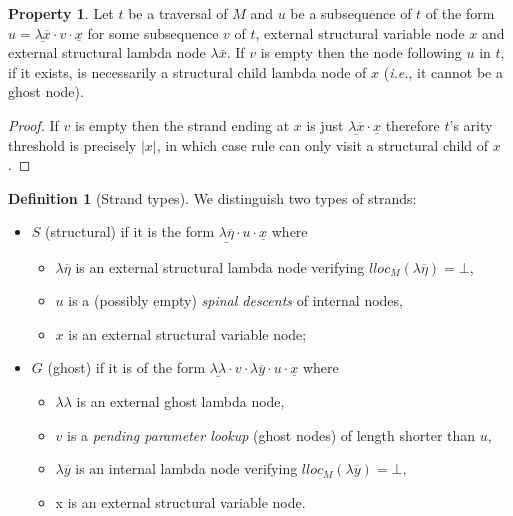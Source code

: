 \documentclass{elsarticle}
\makeatletter
\theoremstyle{plain}
\theoremstyle{definition}
\newtheorem{definition}{Definition}[section]
\newtheorem{property}{Property}[section]
\theoremstyle{remark}
\newcommand{\ghostlmd}{{\lambda\!\!\lambda}}
\renewcommand\ie{{\it i.e.\@\xspace}}
\makeatother
\begin{document}
\begin{property}
\label{prop:strand_spinaldescent}
Let $t$ be a traversal of $M$ and $u$ be a subsequence of $t$ of the form
$u = \underline{\lambda \overline{x}} \cdot v \cdot \underline{x}$
for some subsequence $v$ of $t$, external structural variable node $x$ and external structural lambda node $\lambda \overline{x}$.
If $v$ is empty then the node following $u$ in $t$, if it exists, is necessarily a structural child lambda node of $x$ (\ie, it cannot be a ghost node).
\end{property}
\begin{proof}
 If $v$ is empty then the strand ending at $x$
 is just $\underline{\lambda \overline{x}} \cdot \underline{x}$ therefore
 $t$'s arity threshold is precisely $|x|$, in which case rule  can only visit a structural child of $x$.
\end{proof}

\begin{definition}[Strand types]
    \label{def:strandtypes} We distinguish two types of strands:
    \begin{itemize}[nosep]
        \item $S$ (structural) if it is the form $\underline{\lambda\overline{\eta}} \cdot u \cdot \underline{x}$
            where
            \begin{itemize}[nosep]
            \item $\lambda\overline{\eta}$ is an external structural lambda node verifying $lloc_M(\lambda\overline\eta) = \bot$,
            \item $u$ is a (possibly empty) \emph{spinal descents} of internal nodes,
            \item $x$ is an external structural variable node;
            \end{itemize}

        \item $G$ (ghost) if it is of the form $\underline{\ghostlmd} \cdot  v \cdot \lambda\overline{y} \cdot u \cdot \underline{x}$
        where
        \begin{itemize}[nosep]
            \item $\ghostlmd$ is an external ghost lambda node,
            \item $v$ is a \emph{pending parameter lookup} (ghost nodes) of length shorter than $u$,
            \item $\lambda\overline{y}$ is an internal lambda node verifying $lloc_M(\lambda\overline{y}) = \bot$,
            \item x is an external structural variable node.
        \end{itemize}
    \end{itemize}
\end{definition}
\end{document}
